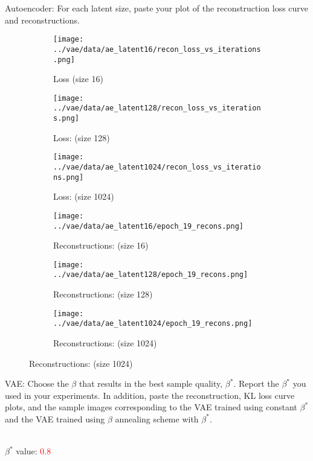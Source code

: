 \documentclass[11pt,addpoints,answers]{exam}
\numberwithin{equation}{section} %
\numberwithin{figure}{section} %
\numberwithin{table}{section} %
\begin{document}
\begin{questions}
\question Autoencoder: For each latent size, paste your plot of the reconstruction loss curve and reconstructions.
\begin{solution}
\begin{figure}[H]
    \centering
    \begin{subfigure}[b]{0.32\linewidth}
    \texttt{[image: ../vae/data/ae\_latent16/recon\_loss\_vs\_iterations.png]}
    \caption{Loss (size 16)}
    \end{subfigure}
    \begin{subfigure}[b]{0.32\linewidth}
        \texttt{[image: ../vae/data/ae\_latent128/recon\_loss\_vs\_iterations.png]}
        \caption{Loss: (size 128)}
    \end{subfigure}
    \begin{subfigure}[b]{0.32\linewidth}
        \texttt{[image: ../vae/data/ae\_latent1024/recon\_loss\_vs\_iterations.png]}
        \caption{Loss: (size 1024)}
    \end{subfigure}
    \begin{subfigure}[b]{0.32\linewidth}
    \texttt{[image: ../vae/data/ae\_latent16/epoch\_19\_recons.png]}
    \caption{Reconstructions: (size 16)}
    \end{subfigure}
    \begin{subfigure}[b]{0.32\linewidth}
        \texttt{[image: ../vae/data/ae\_latent128/epoch\_19\_recons.png]}
        \caption{Reconstructions: (size 128)}
    \end{subfigure}
    \begin{subfigure}[b]{0.32\linewidth}
        \texttt{[image: ../vae/data/ae\_latent1024/epoch\_19\_recons.png]}
        \caption{Reconstructions: (size 1024)}
    \end{subfigure}
\end{figure}
\end{solution}
\clearpage
\question VAE: Choose the $\beta$ that results in the best sample quality, $\beta^*$. Report the $\beta^*$ you used in your experiments. In addition, paste the reconstruction, KL loss curve plots, and the sample images corresponding to the VAE trained using constant $\beta^*$ and the VAE trained using $\beta$ annealing scheme with $\beta^*$.
\begin{solution}
\\
$\beta^*$ value: \textcolor{red}{0.8}
\begin{figure}[H]
    \centering

\end{figure}
\end{solution}
\end{questions}
\end{document}
